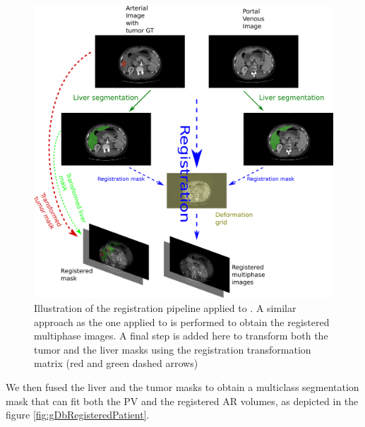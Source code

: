 \begin{figure}[th!]
\centering
\includegraphics[width=0.9\linewidth]{images/GDB/GDB_registration_pipeline_vertical}
\caption{Illustration of the registration pipeline applied to . A similar approach as the one applied to  is performed to obtain the registered multiphase images. A final step is added here to transform both the tumor and the liver masks using the registration transformation matrix (red and green dashed arrows)}
\label{fig:GDB_registration_pipeline_vertical}
\end{figure}

We then fused the liver and the tumor masks to obtain a multiclass
segmentation mask that can fit both the PV and the registered AR volumes, as depicted in the figure \ref{fig:gDbRegisteredPatient}.

